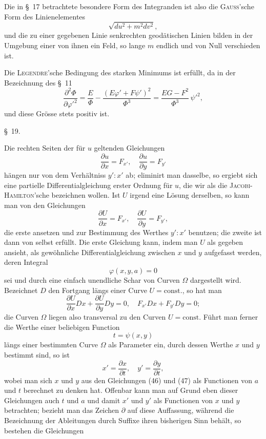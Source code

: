 \documentclass[11pt,a4paper,leqno]{article}
\begin{document}
Die in \S~17 betrachtete besondere Form des Integranden ist also die \textsc{Gauss}'sche Form des Linienelementes
\[
\sqrt{du^2+m^2dv^2},
\]
und die zu einer gegebenen Linie senkrechten geodätischen Linien bilden in der Umgebung einer von ihnen ein Feld, so lange $m$ endlich und von Null verschieden ist.

Die \textsc{Legendre}'sche Bedingung des starken Minimums ist erfüllt, da in der Bezeichnung des \S~11
\[
\frac{\partial^2\Phi}{\partial\varphi'^2}
=
\frac{E}{\Phi}
-
\frac{(E\varphi'+F\psi')^2}{\Phi^3}
=
\frac{EG-F^2}{\Phi^3}\,\psi'^2,
\]
und diese Grösse stets positiv ist.

\begin{center}{\large \S~19.}\end{center}

Die rechten Seiten der für $u$ geltenden Gleichungen
\[
\frac{\partial u}{\partial x}=F_{x'},\quad
\frac{\partial u}{\partial y}=F_{y'}
\]
hängen nur von dem Verhältniss $y':x'$ ab; eliminirt man dasselbe, so ergiebt sich eine partielle Differentialgleichung erster Ordnung für $u$, die wir als die \textsc{Jacobi-Hamilton}'sche bezeichnen wollen. Ist $U$ irgend eine Lösung derselben, so kann man von den Gleichungen
\begin{equation}\tag{45}
\frac{\partial U}{\partial x}=F_{x'},\quad
\frac{\partial U}{\partial y}=F_{y'},
\end{equation}
die erste ansetzen und zur Bestimmung des Werthes $y':x'$ benutzen; die zweite ist dann von selbst erfüllt. Die erste Gleichung kann, indem man $U$ als gegeben ansieht, als gewöhnliche Differentialgleichung zwischen $x$ und $y$ aufgefasst werden, deren Integral
\begin{equation}\tag{46}
\varphi(x,y,a)=0
\end{equation}
sei und durch eine einfach unendliche Schar von Curven $\Omega$ dargestellt wird. Bezeichnet $D$ den Fortgang längs einer Curve $U=\text{const.}$, so hat man
\[
\frac{\partial U}{\partial x}Dx+\frac{\partial U}{\partial y}Dy=0,\quad
F_{x'}Dx+F_{y'}Dy=0;
\]
die Curven $\Omega$ liegen also transversal zu den Curven $U=\text{const.}$ Führt man ferner die Werthe einer beliebigen Function
\begin{equation}\tag{47}
t=\psi(x,y)
\end{equation}
längs einer bestimmten Curve $\Omega$ als Parameter ein, durch dessen Werthe $x$ und $y$ bestimmt sind, so ist
\[
x'=\frac{\partial x}{\partial t},\quad y'=\frac{\partial y}{\partial t},
\]
wobei man sich $x$ und $y$ aus den Gleichungen (46) und (47) als Functionen von $a$ und $t$ berechnet zu denken hat. Offenbar kann man auf Grund eben dieser Gleichungen auch $t$ und $a$ und damit $x'$ und $y'$ als Functionen von $x$ und $y$ betrachten; bezieht man das Zeichen $\partial$ auf diese Auffassung, während die Bezeichnung der Ableitungen durch Suffixe ihren bisherigen Sinn behält, so bestehen die Gleichungen
\end{document}

